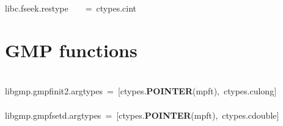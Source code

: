 \documentclass{article}\usepackage[]{graphicx}\usepackage[dvipsnames,table]{xcolor}
\makeatletter
\newcommand{\hlnum}[1]{\textcolor[rgb]{0.686,0.059,0.569}{#1}}%
\newcommand{\hlopt}[1]{\textcolor[rgb]{0,0,0}{#1}}%
\newcommand{\hldef}[1]{\textcolor[rgb]{0.345,0.345,0.345}{#1}}%
\newcommand{\hlkwd}[1]{\textcolor[rgb]{0.737,0.353,0.396}{\textbf{#1}}}%
\newenvironment{kframe}{%
 \def\at@end@of@kframe{}%
 \ifinner\ifhmode%
  \def\at@end@of@kframe{\end{minipage}}%
  \begin{minipage}{\columnwidth}%
 \fi\fi%
 \def\FrameCommand##1{\hskip\@totalleftmargin \hskip-\fboxsep
 \colorbox{shadecolor}{##1}\hskip-\fboxsep
     \hskip-\linewidth \hskip-\@totalleftmargin \hskip\columnwidth}%
 \MakeFramed {\advance\hsize-\width
   \@totalleftmargin\z@ \linewidth\hsize
   \@setminipage}}%
 {\par\unskip\endMakeFramed%
 \at@end@of@kframe}
\newenvironment{knitrout}{}{} %
\makeatother
\begin{document}
\begin{center}
\begin{minipage}[m]{15cm}
\begin{knitrout}
\begin{kframe}
\hldef{\textunderscore libc}\hlopt{.}\hldef{fseek}\hlopt{.}\hldef{restype}\hldef{\ \ \ \ }\hldef{}\hlopt{=\ }\hldef{ctypes}\hlopt{.}\hldef{c\textunderscore int}\hldef{\ \ }\hldef{}\hldef{}\hspace*{\fill}
\mbox{}
\normalfont
\end{kframe}
\end{knitrout}
\end{minipage}
\end{center}


\newpage
\section{GMP functions}
\begin{center}
\begin{minipage}[m]{15cm}
\begin{knitrout}\small
{}\color{fgcolor}\begin{kframe}
\noindent
\ttfamily
\hldef{}\hspace*{\fill}\\
\hldef{\textunderscore libgmp}\hlnum{.\textunderscore \textunderscore }\hldef{gmpf}\hlnum{\textunderscore }\hldef{init}\hlnum{2}\hldef{}\hlopt{.}\hldef{argtypes\ }\hlopt{=\ {[}}\hldef{ctypes}\hlopt{.}\hldef{}\hlkwd{POINTER}\hldef{}\hlopt{(}\hldef{mpf\textunderscore t}\hlopt{),\ }\hldef{ctypes}\hlopt{.}\hldef{c\textunderscore ulong}\hlopt{{]}\ }\hspace*{\fill}\\
\hldef{}\hspace*{\fill}\\
\hldef{\textunderscore libgmp}\hlnum{.\textunderscore \textunderscore }\hldef{gmpf}\hlnum{\textunderscore }\hldef{set}\hlnum{\textunderscore }\hldef{d}\hlopt{.}\hldef{argtypes\ }\hlopt{=\ {[}}\hldef{ctypes}\hlopt{.}\hldef{}\hlkwd{POINTER}\hldef{}\hlopt{(}\hldef{mpf\textunderscore t}\hlopt{),\ }\hldef{ctypes}\hlopt{.}\hldef{c\textunderscore double}\hlopt{{]}}\hspace*{\fill}\\
\hldef{}\hspace*{\fill}\\

\end{kframe}
\end{knitrout}
\end{minipage}
\end{center}
\end{document}
